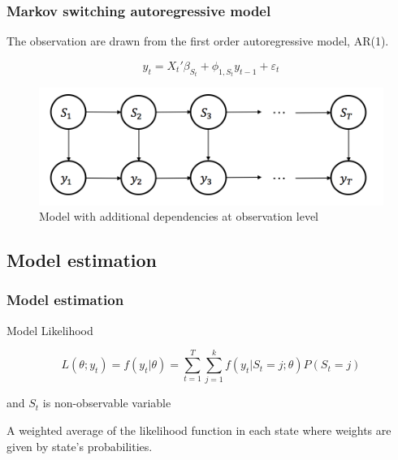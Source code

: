 \documentclass{beamer}
\begin{document}
\begin{frame}
\frametitle{Markov switching autoregressive model}
The observation are drawn from the first order autoregressive model, AR(1).

$$y_{t} = {X_{t}}' \beta_{S_{t}} + \phi_{1,S_{t}} y_{t-1} + \varepsilon_{t}$$

\begin{figure}
	\includegraphics[width=0.5\linewidth]{msm-ar}
	\caption{Model with additional dependencies at observation level}
\end{figure}
\end{frame}

\subsection{Model estimation}
\begin{frame}
\frametitle{Model estimation}







\begin{large}
	Model Likelihood
	
	$$L(\theta;y_{t}) = f(y_{t}|\theta) = \sum_{t=1}^{T}\sum_{j=1}^{k} f(y_{t}|S_{t}=j;\theta)P(S_{t}=j)$$
	
	\vspace{1em}
	
	and $S_{t}$ is non-observable variable
	\vspace{1em}
	
	A weighted average of the likelihood function in each state where weights are given by state's probabilities.
\end{large}

\end{frame}
\end{document}
